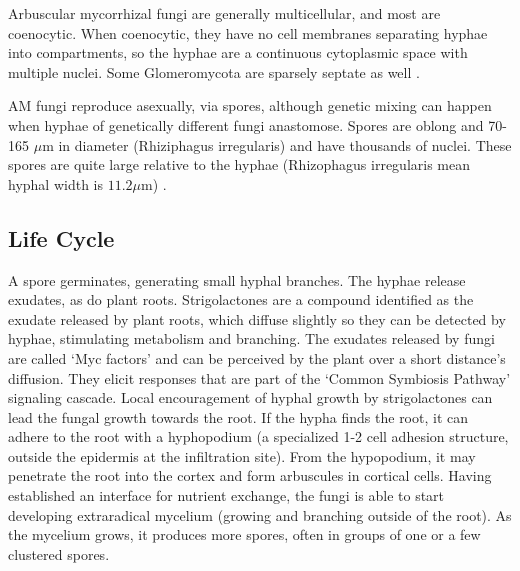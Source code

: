 \documentclass{article}
\begin{document}
Arbuscular mycorrhizal fungi are generally multicellular, and most are coenocytic. When coenocytic, they have no cell membranes separating hyphae into compartments, so the hyphae are a continuous cytoplasmic space with multiple nuclei. Some Glomeromycota are sparsely septate as well \cite{Glomeromycota}.




AM fungi reproduce asexually, via spores, although genetic mixing can happen when hyphae of genetically different fungi anastomose. Spores are oblong and 70-165 $\mu$m in diameter (Rhiziphagus irregularis) \cite{INVAMirregularis} and have thousands of nuclei. These spores are quite large relative to the hyphae (Rhizophagus irregularis mean hyphal width is $11.2 \mu$m) \cite{INVAMirregularis}.

\subsection{Life Cycle}

A spore germinates, generating small hyphal branches. 
The hyphae release exudates, as do plant roots.
Strigolactones are a compound identified as the exudate released by plant roots, which diffuse slightly so they can be detected by hyphae, stimulating metabolism and branching. 
The exudates released by fungi are called  `Myc factors' and can be perceived by the plant over a short distance's diffusion. They elicit responses that are part of the `Common Symbiosis Pathway' signaling cascade.
Local encouragement of hyphal growth by strigolactones can lead the fungal growth towards the root. 
If the hypha finds the root, it can adhere to the root with a hyphopodium (a specialized 1-2 cell adhesion structure, outside the epidermis at the infiltration site). 
From the hypopodium, it may penetrate the root into the cortex and form arbuscules in cortical cells.
Having established an interface for nutrient exchange, the fungi is able to start developing extraradical mycelium (growing and branching outside of the root). As the mycelium grows, it produces more spores, often in groups of one or a few clustered spores.
\end{document}
